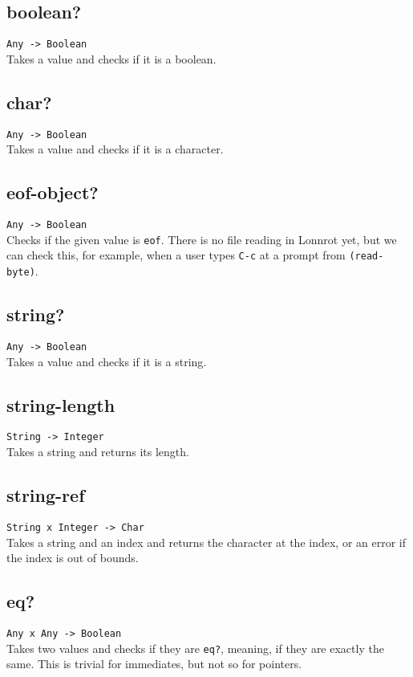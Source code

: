 \subsection*{boolean?}
\texttt{Any -> Boolean}\\
\noindent Takes a value and checks if it is a boolean.

\subsection*{char?}
\texttt{Any -> Boolean}\\
\noindent Takes a value and checks if it is a character.

\subsection*{eof-object?}
\texttt{Any -> Boolean}\\
\noindent Checks if the given value is \texttt{eof}. There is no file reading in Lonnrot yet, but we can
check this, for example, when a user types \texttt{C-c} at a prompt from \texttt{(read-byte)}.

\subsection*{string?}
\texttt{Any -> Boolean}\\
\noindent Takes a value and checks if it is a string.

\subsection*{string-length}
\texttt{String -> Integer}\\
\noindent Takes a string and returns its length.

\subsection*{string-ref}
\texttt{String x Integer -> Char}\\
\noindent Takes a string and an index and returns the character at the index, or an error if the index is out of bounds.

\subsection*{eq?}
\texttt{Any x Any -> Boolean}\\
\noindent Takes two values and checks if they are \texttt{eq?}, meaning, if they are exactly the same. This is
trivial for immediates, but not so for pointers.

